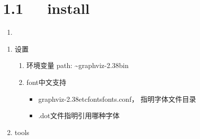 \documentclass[letterpaper,12pt,english]{sphinxmanual}
\begin{document}
\section{1.1   install}
\label{\detokenize{001software/001install/Graphviz:install}}\begin{enumerate}
%
\item {} 

\end{enumerate}
\begin{enumerate}
%
\setcounter{enumi}{1}
\item {} 
设置
\begin{enumerate}
%
\item {} 
环境变量
path: \textasciitilde{}graphviz-2.38bin

\item {} 
font中文支持
\begin{itemize}
\item {} 
graphviz-2.38etcfontsfonts.conf， 指明字体文件目录

\end{itemize}
\begin{quote}

\begin{sphinxVerbatim}[commandchars=\\\{\}]
\PYGZbs{}\PYGZbs{}
\end{sphinxVerbatim}
\end{quote}
\begin{itemize}
\item {} 
.dot文件指明引用哪种字体

\end{itemize}
\begin{quote}

\begin{sphinxVerbatim}[commandchars=\\\{\}]
 \PYG{p}{[}\PYG{p}{]}
 \PYG{p}{[}\PYG{p}{]}
\end{sphinxVerbatim}
\end{quote}

\end{enumerate}

\item {} 
tools

\end{enumerate}
\end{document}
